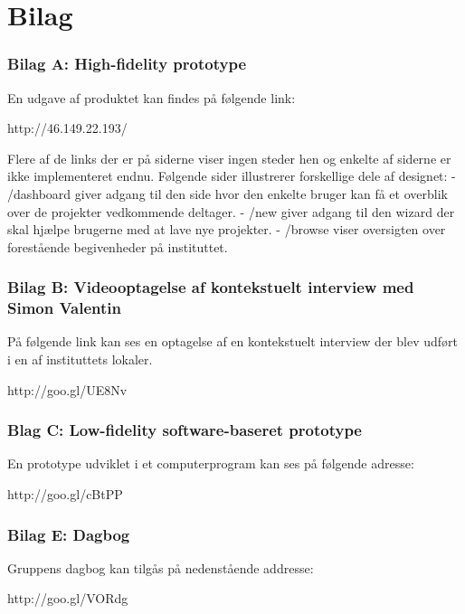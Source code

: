 \chapter{Bilag}

\subsection{Bilag A: High-fidelity prototype}
En udgave af produktet kan findes på følgende link:

http://46.149.22.193/

Flere af de links der er på siderne viser ingen steder hen og enkelte af siderne er ikke implementeret endnu. Følgende sider illustrerer forskellige dele af designet:
- /dashboard giver adgang til den side hvor den enkelte bruger kan få et overblik over de projekter vedkommende deltager.
- /new giver adgang til den wizard der skal hjælpe brugerne med at lave nye projekter.
- /browse viser oversigten over forestående begivenheder på instituttet.

\subsection{Bilag B: Videooptagelse af kontekstuelt interview med Simon Valentin}
På følgende link kan ses en optagelse af en kontekstuelt interview der blev udført i en af instituttets lokaler.

http://goo.gl/UE8Nv

\subsection{Blag C: Low-fidelity software-baseret prototype}
En prototype udviklet i et computerprogram kan ses på følgende adresse:

http://goo.gl/cBtPP

\subsection{Bilag E: Dagbog}
Gruppens dagbog kan tilgås på nedenstående addresse:

http://goo.gl/VORdg
